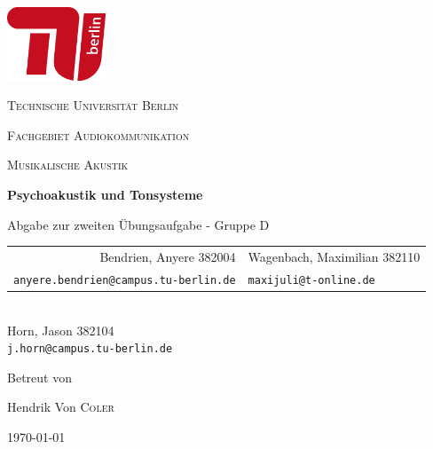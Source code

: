 \begin{titlepage}
    \centering
    \includegraphics[height=62pt]{tu_red.png}\par
    {\scshape\huge Technische Universität Berlin \par}
    {\scshape\Large Fachgebiet Audiokommunikation\par}
    \vspace{1.5cm}
    {\scshape\LARGE Musikalische Akustik\par}
    \vspace{1.5cm}

    {\Huge\bfseries {Psychoakustik und Tonsysteme}\par}
    \vspace{0.1cm}
    {\large Abgabe zur zweiten Übungsaufgabe - Gruppe D \par}
    \vspace{1cm}

    {\itshape
        \begin{tabular}{rl}
          Bendrien, Anyere 382004 &
          Wagenbach, Maximilian 382110 \\
          \vspace{0.2cm}
          \small \texttt{anyere.bendrien@campus.tu-berlin.de} &
          \small \texttt{maxijuli@t-online.de}
        \end{tabular}\\
        Horn, Jason 382104 \\
        \small \texttt{j.horn@campus.tu-berlin.de} 
    }
    \vfill
    
    Betreut von\par
    Hendrik Von \textsc{Coler}
    \vspace{1cm}
    
    {\large \today\par}
\end{titlepage}